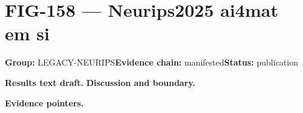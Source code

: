 \clearpage
\section{FIG-158 --- Neurips2025 ai4mat em si}
\label{figpage:fig-158}
\textbf{Group:} LEGACY-NEURIPS\quad \textbf{Evidence chain:} manifested\quad \textbf{Status:} publication

\textbf{Results text draft.} 
\textbf{Discussion and boundary.} 


\textbf{Evidence pointers.}



\vfill
